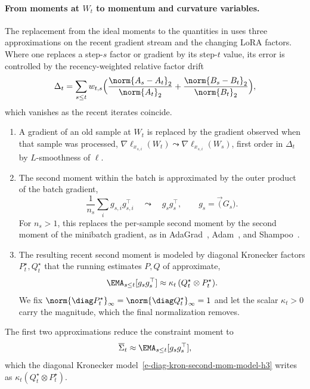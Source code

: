 \paragraph{From moments at $W_t$ to momentum and curvature variables.}
The replacement from the ideal moments to the quantities in
 uses three approximations on the recent gradient stream and
the changing LoRA factors. Where one replaces a step-$s$ factor or gradient by
its step-$t$ value, its error is controlled by the recency-weighted relative
factor drift
\[
  \Delta_t=\sum_{s\le t}w_{t,s}\Big(\frac{\norm{A_s-A_t}_2}{\norm{A_t}_2}
  +\frac{\norm{B_s-B_t}_2}{\norm{B_t}_2}\Big),
\]
which vanishes as the recent iterates coincide.
\begin{enumerate}[leftmargin=1.6em,itemsep=2pt,topsep=2pt]
  \item A gradient of an old sample at $W_t$ is replaced by the gradient
  observed when that sample was processed,
  $\nabla\ell_{x_{s,i}}(W_t)\leadsto\nabla\ell_{x_{s,i}}(W_s)$, first order in
  $\Delta_t$ by $L$-smoothness of $\ell$.
  \item The second moment within the batch is approximated by the outer
  product of the batch gradient,
  \[
    \frac1{n_s}\sum_i g_{s,i}g_{s,i}^\top
    \quad\leadsto\quad
    g_sg_s^\top,
    \qquad g_s=\vec(G_s).
  \]
  For $n_s>1$, this replaces the per-sample second moment by the
  second moment of the minibatch gradient, as in AdaGrad~\cite{adagrad},
  Adam~\cite{adam}, and Shampoo~\cite{shampoo}.
  \item The resulting recent second moment is modeled by diagonal
  Kronecker factors $P^\star_t,Q^\star_t$ that the running estimates $P,Q$
  of  approximate,
  \begin{equation}\label{e-diag-kron-second-mom-model-h3}
    \EMA_{s\le t}[g_sg_s^\top]\approx\kappa_t\,(Q^\star_t\otimes P^\star_t).
  \end{equation}
  We fix $\norm{\diag P^\star_t}_\infty=\norm{\diag Q^\star_t}_\infty=1$ and
  let the scalar $\kappa_t>0$ carry the magnitude, which the final
  normalization removes.
\end{enumerate}
The first two approximations reduce the constraint moment to
\[
  \overline\Sigma_t\approx\EMA_{s\le t}[g_sg_s^\top],
\]
which the diagonal Kronecker model~\eqref{e-diag-kron-second-mom-model-h3}
writes as $\kappa_t(Q^\star_t\otimes P^\star_t)$.

